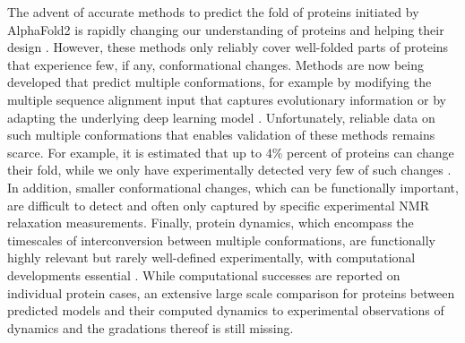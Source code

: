 The advent of accurate methods to predict the fold of proteins initiated by AlphaFold2 \cite{jumper_highly_2021} is rapidly changing our understanding of proteins \cite{bordin_alphafold2_2023, durairaj_uncovering_2023} and helping their design \cite{dauparas_robust_2022, watson_novo_2023, sumida_improving_2024}. However, these methods only reliably cover well-folded parts of proteins that experience few, if any, conformational changes. Methods are now being developed that predict multiple conformations, for example by modifying the multiple sequence alignment input that captures evolutionary information \cite{wayment-steele_predicting_2023} or by adapting the underlying deep learning model \cite{heo_multi-state_2022}. Unfortunately, reliable data on such multiple conformations that enables validation of these methods remains scarce. For example, it is estimated that up to 4\% percent of proteins can change their fold, while we only have experimentally detected very few of such changes \cite{porter_extant_2018}. In addition, smaller conformational changes, which can be functionally important, are difficult to detect and often only captured by specific experimental NMR relaxation measurements\cite{kovermann_2016}. Finally, protein dynamics, which encompass the timescales of interconversion between multiple conformations, are functionally highly relevant but rarely well-defined experimentally, with computational developments essential \cite{noe_machine_2020}. While computational successes are reported on individual protein cases, an extensive large scale comparison for proteins between predicted models and their computed dynamics to experimental observations of dynamics and the gradations thereof is still missing.


